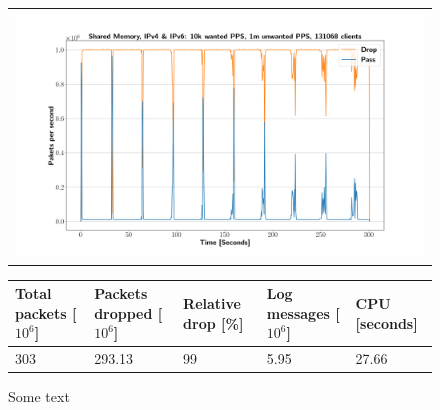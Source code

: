\begin{figure}[p]
	\label{fig:simplefail2ban:shm:ip46:1m}
	\centering
	\scriptsize
	\begin{tabular}{c}
    	\centerline{\includegraphics[width=1.2\textwidth]{images/simplefail2ban_shm_ipv46_v10k_iv1m_c131068.png}}
	\end{tabular}
	\begin{tabular}{lllll}
		\toprule
		\textbf{Total packets [$10^6$]} & \textbf{Packets dropped [$10^6$]} & \textbf{Relative drop [\%]} & \textbf{Log messages [$10^6$]} & \textbf{CPU [seconds]} \\ \midrule 
		303 & 293.13 & 99 & 5.95 & 27.66 \\
		\bottomrule
	\end{tabular}
	\caption[Simplefail2ban, Shared Memory, IPv4 \& IPv6, 1m \ac{PPS}]{Some text}
\end{figure}

